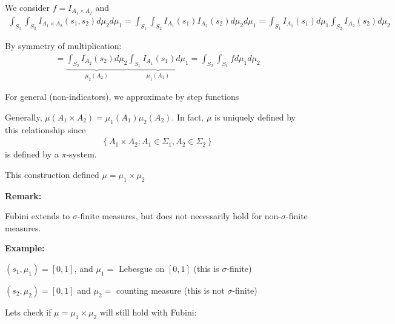 \par\bigskip
\begin{prf}{}
  We consider $f = I_{A_1\times A_2}$ and 
  \begin{equation*}
    \begin{gathered}
      \int_{S_1}\int_{S_2}I_{A_1\times A_2}(s_1,s_2)d\mu_2d\mu_1 = \int_{S_1}\int_{S_2}I_{A_1}(s_1)I_{A_2}(s_2)d\mu_2d\mu_1 = \int_{S_1}I_{A_1}(s_1)d\mu_1\int_{S_2}I_{A_2}(s_2)d\mu_2
    \end{gathered}
  \end{equation*}\par
  \noindent By symmetry of multiplication:
  \begin{equation*}
    \begin{gathered}
      =\underbrace{\int_{S_2}I_{A_2}(s_2)d\mu_2}_{\mu_2(A_2)}\underbrace{\int_{S_1}I_{A_1}(s_1)d\mu_1}_{\mu_1(A_1)} = \int_{S_2}\int_{S_1}fd\mu_1d\mu_2
    \end{gathered}
  \end{equation*}\par
  \noindent For general (non-indicators), we approximate by step functions
\end{prf}
\par\bigskip
\noindent Generally, $\mu(A_1\times A_2) = \mu_1(A_1)\mu_2(A_2)$. In fact, $\mu$ is uniquely defined by this relationship since 
\begin{equation*}
  \begin{gathered}
    \left\{A_1\times A_2:A_1\in\Sigma_1,A_2\in\Sigma_2\right\}
  \end{gathered}
\end{equation*}is defined by a $\pi$-system.\par
\noindent This construction defined $\mu = \mu_1\times\mu_2$
\par\bigskip
\noindent\textbf{Remark:}\par
\noindent Fubini extends to $\sigma$-finite measures, but does not necessarily hold for non-$\sigma$-finite measures.
\par\bigskip
\noindent\textbf{Example:}\par
\noindent $(s_1,\mu_1) = [0,1]$, and $\mu_1 = $ Lebesgue on $[0,1]$ (this is $\sigma$-finite)\par
\noindent $(s_2,\mu_2) = [0,1]$ and $\mu_2 =$ counting measure (this is not $\sigma$-finite)\par
\noindent Lets check if $\mu = \mu_1\times\mu_2$ will still hold with Fubini:\par
